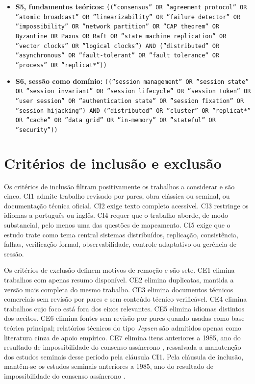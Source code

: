 \begin{itemize}[leftmargin=*]
    \item \textbf{S5, fundamentos teóricos:} \texttt{((''consensus'' OR ''agreement protocol'' OR ''atomic broadcast'' OR ''linearizability'' OR ''failure detector'' OR ''impossibility'' OR ''network partition'' OR ''CAP theorem'' OR Byzantine OR Paxos OR Raft OR ''state machine replication'' OR ''vector clocks'' OR ''logical clocks'') AND (''distributed'' OR ''asynchronous'' OR ''fault-tolerant'' OR ''fault tolerance'' OR ''process'' OR ''replicat*''))}

    \item \textbf{S6, sessão como domínio:} \texttt{((''session management'' OR ''session state'' OR ''session invariant'' OR ''session lifecycle'' OR ''session token'' OR ''user session'' OR ''authentication state'' OR ''session fixation'' OR ''session hijacking'') AND (''distributed'' OR ''cluster'' OR ''replicat*'' OR ''cache'' OR ''data grid'' OR ''in-memory'' OR ''stateful'' OR ''security''))}
\end{itemize}

\section*{Critérios de inclusão e exclusão}
\label{ap-criterios}

Os critérios de inclusão filtram positivamente os trabalhos a considerar e são cinco. CI1 admite trabalho revisado por pares, obra clássica ou seminal, ou documentação técnica oficial. CI2 exige texto completo acessível. CI3 restringe os idiomas a português ou inglês. CI4 requer que o trabalho aborde, de modo substancial, pelo menos uma das questões de mapeamento. CI5 exige que o estudo trate como tema central sistemas distribuídos, replicação, consistência, falhas, verificação formal, observabilidade, controle adaptativo ou gerência de sessão.

Os critérios de exclusão definem motivos de remoção e são sete. CE1 elimina trabalhos com apenas resumo disponível. CE2 elimina duplicatas, mantida a versão mais completa do mesmo trabalho. CE3 elimina documentos técnicos comerciais sem revisão por pares e sem conteúdo técnico verificável. CE4 elimina trabalhos cujo foco está fora dos eixos relevantes. CE5 elimina idiomas distintos dos aceitos. CE6 elimina fontes sem revisão por pares quando usadas como base teórica principal; relatórios técnicos do tipo \emph{Jepsen} são admitidos apenas como literatura cinza de apoio empírico. CE7 elimina itens anteriores a 1985, ano do resultado de impossibilidade do consenso assíncrono \citep{fischer_lynch_paterson_flp_1985}, ressalvada a manutenção dos estudos seminais desse período pela cláusula CI1. Pela cláusula de inclusão, mantêm-se os estudos seminais anteriores a 1985, ano do resultado de impossibilidade do consenso assíncrono \citep{fischer_lynch_paterson_flp_1985}.

